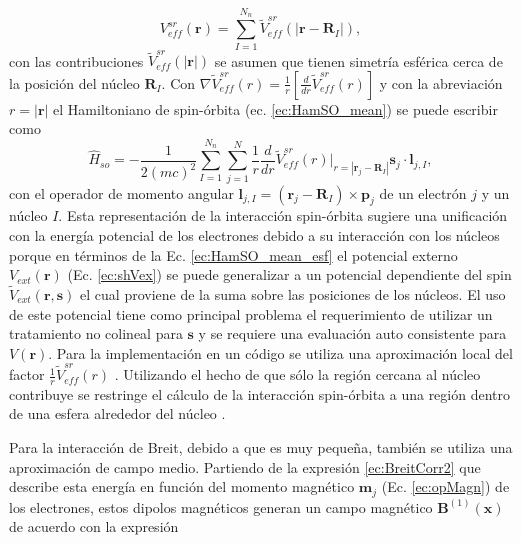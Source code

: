 \begin{equation}
	V_{eff}^{sr} (\pmb{r}) = \sum_{I=1}^{N_n} \tilde{V}_{eff}^{sr} (|\pmb{r}- \pmb{R}_I|), \label{ec:descVeffSR}
\end{equation}  
con las contribuciones $\tilde{V}_{eff}^{sr} (|\pmb{r}|)$ se asumen que tienen simetr\'ia esf\'erica cerca de la posici\'on del n\'ucleo $\pmb{R}_I$. Con $\nabla  \tilde{V}_{eff}^{sr} (r) = \frac{1}{r} \left[\frac{d}{dr} \tilde{V}_{eff}^{sr} (r) \right]$ y con la abreviaci\'on $r = |\pmb{r}|$ el Hamiltoniano de spin-\'orbita (ec. \ref{ec:HamSO_mean}) se puede escribir como \cite{PhysRevB.64.073106}
\begin{equation}
	\hat{H}_{so} =- \frac{1}{2 (mc)^2} \sum_{I=1}^{N_n} \sum_{j=1}^N \frac{1}{r} \frac{d}{dr} \tilde{V}_{eff}^{sr} (r) |_{r=|\pmb{r}_j -\pmb{R}_I|} \pmb{s}_j \cdot \pmb{l}_{j,I}  \label{ec:HamSO_mean_esf} ,
\end{equation}
con el operador de momento angular $\pmb{l}_{j,I} = (\pmb{r}_j - \pmb{R}_I) \times \pmb{p}_j$ de un electr\'on $j$ y un n\'ucleo $I$. Esta representaci\'on de la interacci\'on spin-\'orbita sugiere una unificaci\'on con la energ\'ia potencial de los electrones debido a su interacci\'on con los n\'ucleos porque en t\'erminos de la Ec. \ref{ec:HamSO_mean_esf} el potencial externo  $V_{ext} (\pmb{r}) $ (Ec. \ref{ec:shVex}) se puede generalizar a un potencial dependiente del spin $\tilde{V}_{ext} (\pmb{r}, \pmb{s})$ el cual proviene de la suma sobre las posiciones de los n\'ucleos. El uso de este potencial tiene como principal problema el requerimiento de utilizar un tratamiento no colineal para $\pmb{s}$ y se requiere una evaluaci\'on auto consistente para $V(\pmb{r})$. Para la implementaci\'on en un c\'odigo se utiliza una aproximaci\'on local del factor $\frac{1}{r} \tilde{V}_{eff}^{sr} (r) $ \cite{MB-2015, PhysRevB.64.073106}. Utilizando el hecho de que s\'olo la regi\'on cercana al n\'ucleo contribuye se restringe el c\'alculo de  la interacci\'on spin-\'orbita a una regi\'on dentro de una esfera alrededor del n\'ucleo \cite{PhysRevB.62.11556}.
\newline
\par Para la interacci\'on de Breit, debido a que es muy peque\~na, tambi\'en se utiliza una aproximaci\'on de campo medio. Partiendo de la expresi\'on  \ref{ec:BreitCorr2} que describe esta energ\'ia en funci\'on del momento magn\'etico $\pmb{m}_j$ (Ec. \ref{ec:opMagn}) de los electrones, estos dipolos magn\'eticos generan un campo magn\'etico $\pmb{B}^{(1)} (\pmb{x}) $ de acuerdo con la expresi\'on \cite{MB-2015, Jackson-1975}
